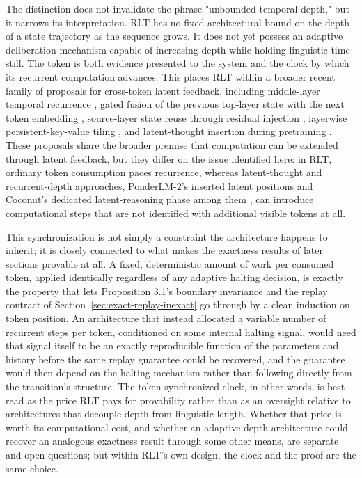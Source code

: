 \documentclass[11pt]{article}
\begin{document}
The distinction does not invalidate the phrase "unbounded temporal depth," but it narrows its interpretation. RLT has no fixed architectural bound on the depth of a state trajectory as the sequence grows. It does not yet possess an adaptive deliberation mechanism capable of increasing depth while holding linguistic time still. The token is both evidence presented to the system and the clock by which its recurrent computation advances. This places RLT within a broader recent family of proposals for cross-token latent feedback, including middle-layer temporal recurrence \cite{cai2026t2mlr}, gated fusion of the previous top-layer state with the next token embedding \cite{wang2026fullbandwidth}, source-layer state reuse through residual injection \cite{huang2026lrt}, layerwise persistent-key-value tiling \cite{oncescu2026recurrent}, and latent-thought insertion during pretraining \cite{zeng2025ponderlm}. These proposals share the broader premise that computation can be extended through latent feedback, but they differ on the issue identified here: in RLT, ordinary token consumption paces recurrence, whereas latent-thought and recurrent-depth approaches, PonderLM-2's inserted latent positions and Coconut's dedicated latent-reasoning phase among them \cite{zeng2025ponderlm,hao2024coconut}, can introduce computational steps that are not identified with additional visible tokens at all.

This synchronization is not simply a constraint the architecture happens to inherit; it is closely connected to what makes the exactness results of later sections provable at all. A fixed, deterministic amount of work per consumed token, applied identically regardless of any adaptive halting decision, is exactly the property that lets Proposition 3.1's boundary invariance and the replay contract of Section~\ref{sec:exact-replay-inexact} go through by a clean induction on token position. An architecture that instead allocated a variable number of recurrent steps per token, conditioned on some internal halting signal, would need that signal itself to be an exactly reproducible function of the parameters and history before the same replay guarantee could be recovered, and the guarantee would then depend on the halting mechanism rather than following directly from the transition's structure. The token-synchronized clock, in other words, is best read as the price RLT pays for provability rather than as an oversight relative to architectures that decouple depth from linguistic length. Whether that price is worth its computational cost, and whether an adaptive-depth architecture could recover an analogous exactness result through some other means, are separate and open questions; but within RLT's own design, the clock and the proof are the same choice.
\end{document}
